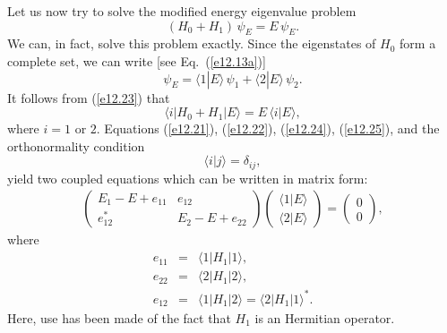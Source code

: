 Let us now try to solve the modified energy eigenvalue problem
\begin{equation}\label{e12.23}
(H_0+H_1)\,\psi_E = E\,\psi_E.
\end{equation}
We can, in fact, solve this problem exactly. Since the eigenstates
of $H_0$ form a complete set, we can write [see Eq.~(\ref{e12.13a})]
\begin{equation}\label{e12.24}
\psi_E = \langle 1|E\rangle\,\psi_1 + \langle 2|E\rangle\,\psi_2.
\end{equation}
It follows from (\ref{e12.23}) that
\begin{equation}\label{e12.25}
\langle i|H_0 + H_1|E\rangle = E\,\langle i|E\rangle,
\end{equation}
where $i=1$ or $2$. Equations (\ref{e12.21}), (\ref{e12.22}), (\ref{e12.24}),
(\ref{e12.25}), and the orthonormality condition
\begin{equation}
\langle i|j\rangle = \delta_{ij},
\end{equation}
yield two coupled equations which can be written
in matrix form:
\begin{eqnarray}\label{e12.27}
\left(\begin{array}{cc}E_1-E+e_{11}& e_{12}\\[0.5ex]
e_{12}^\ast& E_2-E+e_{22}\end{array}\right)\left(
\begin{array}{c}\langle 1|E\rangle\\[0.5ex]
\langle 2|E\rangle\end{array}\right)=\left(
\begin{array}{c} 0\\[0.5ex]
0\end{array}\right),
\end{eqnarray}
where
\begin{eqnarray}
e_{11} &=& \langle 1|H_1|1\rangle,\\[0.5ex]
e_{22}&=&\langle 2|H_1|2\rangle,\\[0.5ex]
e_{12}&=&\langle 1|H_1|2\rangle = \langle 2|H_1|1\rangle^\ast.
\end{eqnarray}
Here, use has been made of the fact that $H_1$ is an Hermitian operator.

